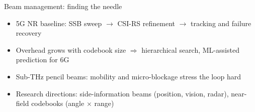 \begin{frame}{Beam management: finding the needle}
  \begin{itemize}\itemsep2pt
    \item 5G NR baseline: SSB sweep $\to$ CSI-RS refinement $\to$ tracking
          and failure recovery
    \item Overhead grows with codebook size $\Rightarrow$ hierarchical search,
          ML-assisted prediction for 6G
    \item Sub-THz pencil beams: mobility and micro-blockage stress the loop
          hard
    \item Research directions: side-information beams (position, vision,
          radar), \alert{near-field codebooks} (angle $\times$ range)
  \end{itemize}
\end{frame}

